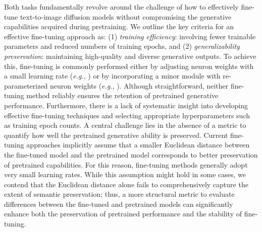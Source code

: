 Both tasks fundamentally revolve around the challenge of how to effectively fine-tune text-to-image diffusion models without compromising the generative capabilities acquired during pretraining. We outline the key criteria for an effective fine-tuning approach as: (1) \emph{training efficiency}: involving fewer trainable parameters and reduced numbers of training epochs, and (2) \emph{generalizability preservation}: maintaining high-quality and diverse generative outputs. To achieve this, fine-tuning is commonly performed either by adjusting neuron weights with a small learning rate (\emph{e.g.}, \cite{ruiz2023dreambooth}) or by incorporating a minor module with re-parameterized neuron weights (\emph{e.g.}, \cite{hulora2022,zhang2023adding}). Although straightforward, neither fine-tuning method reliably ensures the retention of pretrained generative performance. Furthermore, there is a lack of systematic insight into developing effective fine-tuning techniques and selecting appropriate hyperparameters such as training epoch counts. A central challenge lies in the absence of a metric to quantify how well the pretrained generative ability is preserved. Current fine-tuning approaches implicitly assume that a smaller Euclidean distance between the fine-tuned model and the pretrained model corresponds to better preservation of pretrained capabilities. For this reason, fine-tuning methods generally adopt very small learning rates. While this assumption might hold in some cases, we contend that the Euclidean distance alone fails to comprehensively capture the extent of semantic preservation; thus, a more structural metric to evaluate differences between the fine-tuned and pretrained models can significantly enhance both the preservation of pretrained performance and the stability of fine-tuning.

